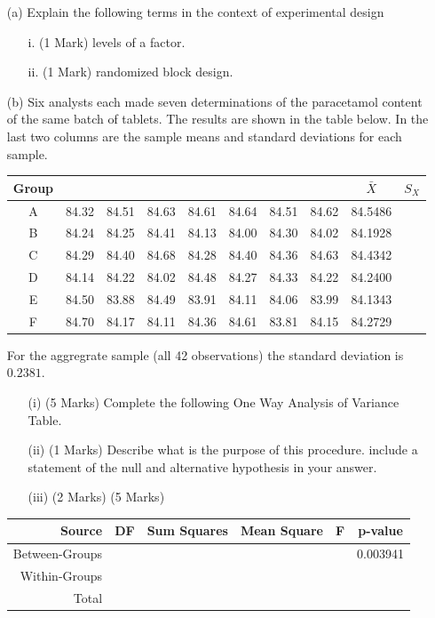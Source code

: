 \documentclass[a4paper,12pt]{article}
\begin{document}
\begin{itemize}
	\item[(a)] Explain the following terms in the context of experimental design
	\begin{itemize}
		\item[i.] (1 Mark) levels of a factor.
		\item[ii.] (1 Mark) randomized block design.
	\end{itemize}

\item[(b)] Six analysts each made seven determinations of the paracetamol content of the same batch of tablets.
The results are shown in the table below. In the last two columns are the sample means and standard deviations for each sample.\\
\bigskip

\begin{tabular}{|c|ccccccc|c|c|}
\hline
Group &  & &  &  &  &  &  & $\bar{X}$& $S_{X}$ \\ \hline
A & 84.32 & 84.51 & 84.63 & 84.61 & 84.64 & 84.51 & 84.62 & 84.5486 & \\ \hline
B & 84.24 & 84.25 & 84.41 & 84.13 & 84.00 & 84.30 & 84.02 & 84.1928 & \\ \hline
C & 84.29 & 84.40 & 84.68 & 84.28 & 84.40 & 84.36 & 84.63 & 84.4342 & \\ \hline
D & 84.14 & 84.22 & 84.02 & 84.48 & 84.27 & 84.33 & 84.22 & 84.2400 & \\ \hline
E & 84.50 & 83.88 & 84.49 & 83.91 & 84.11 & 84.06 & 83.99 & 84.1343 & \\ \hline
F & 84.70 & 84.17 & 84.11 & 84.36 & 84.61 & 83.81 & 84.15 & 84.2729 & \\ \hline
\end{tabular} 


\bigskip

For the aggregrate sample (all 42 observations) the standard deviation is $0.2381$.

\begin{itemize}
\item[(i)] (5 Marks) Complete the following One Way Analysis of Variance Table.
\item[(ii)] (1 Marks) Describe what is the purpose of this procedure. include a statement of the null and alternative hypothesis in your answer.
\item[(iii)] (2 Marks) (5 Marks)
\end{itemize}
\begin{tabular}{|r|c|c|c|c|c|}
	\hline Source  &\phantom{sp} DF \phantom{sp} & Sum Squares & Mean Square  & \phantom{sp} F \phantom{sp} & p-value  \\ 
	\hline Between-Groups &  &  &  &  & 0.003941 \\ 
	\hline Within-Groups &  &  &  &  &  \\ \hline
	\hline Total &  &  &  &  &  \\ 
	\hline 
\end{tabular} 



\end{itemize}
\end{document}
